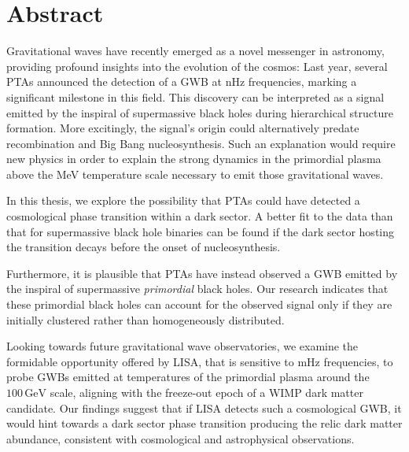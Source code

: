 \begingroup
\let\clearpage\relax
\let\cleardoublepage\relax
\let\cleardoublepage\relax
\chapter*{Abstract}

Gravitational waves have recently emerged as a novel messenger in astronomy, providing profound insights into the evolution of the cosmos: Last year, several \acp{PTA} announced the detection of a \ac{GWB} at nHz frequencies, marking a significant milestone in this field. This discovery can be interpreted as a signal emitted by the inspiral of supermassive black holes during hierarchical structure formation. More excitingly, the signal’s origin could alternatively predate recombination and Big Bang nucleosynthesis. Such an explanation would require new physics in order to explain the strong dynamics in the primordial plasma above the MeV temperature scale necessary to emit those gravitational waves.

In this thesis, we explore the possibility that \acp{PTA} could have detected a cosmological phase transition within a dark sector. A better fit to the data than that for supermassive black hole binaries can be found if the dark sector hosting the transition decays before the onset of nucleosynthesis.

Furthermore, it is plausible that \acp{PTA} have instead observed a \ac{GWB} emitted by the inspiral of supermassive \textit{primordial} black holes. Our research indicates that these primordial black holes can account for the observed signal only if they are initially clustered rather than homogeneously distributed.

Looking towards future gravitational wave observatories, we examine the formidable opportunity offered by \acs{LISA}, that is sensitive to mHz frequencies, to probe \acsp{GWB} emitted at temperatures of the primordial plasma around the $100 \, \text{GeV}$ scale, aligning with the freeze-out epoch of a \acs{WIMP} dark matter candidate. Our findings suggest that if \acs{LISA} detects such a cosmological \ac{GWB}, it would hint towards a dark sector phase transition producing the relic dark matter abundance, consistent with cosmological and astrophysical observations.


